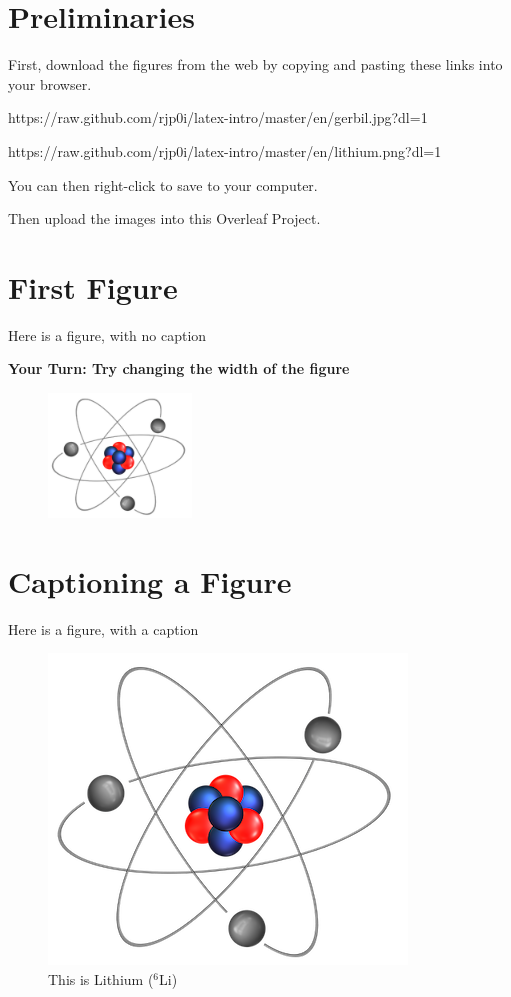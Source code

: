 \documentclass{article}
\begin{document}
\section{Preliminaries}
First, download the figures from the web by copying and pasting these links into your browser.

https://raw.github.com/rjp0i/latex-intro/master/en/gerbil.jpg?dl=1

https://raw.github.com/rjp0i/latex-intro/master/en/lithium.png?dl=1

You can then right-click to save to your computer.

Then upload the images into this Overleaf Project.


\section{First Figure}

Here is a figure, with no caption
\medskip

{\bf Your Turn: Try changing the width of the figure}

\begin{figure}
\centering   %
\includegraphics[width=1.5in]{lithium.png} %
\end{figure}
\clearpage
\section{Captioning a Figure}
Here is a figure, with a caption

\begin{figure}
\centering
\includegraphics[scale=0.5]{lithium.png} %
\caption{This is Lithium (${}^{6}$Li)}
\end{figure}
\clearpage
\end{document}
